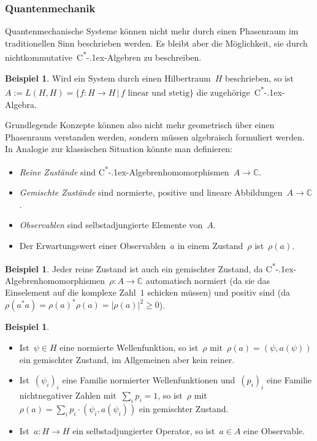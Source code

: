 \documentclass[a4paper,ngerman,12pt]{scrartcl}
\theoremstyle{definition}
\newtheorem{bsp}[defn]{Beispiel}
\theoremstyle{plain}
\theoremstyle{remark}
\newcommand{\CC}{\mathbb{C}}
\newcommand{\csalgebra}{C\textsuperscript{*}\kern-.1ex-Algebra}
\newcommand{\csalgebren}{C\textsuperscript{*}\kern-.1ex-Alge\-bren}
\renewcommand{\_}{\mathpunct{.}\,}
\newcommand{\?}{\,{:}\,}
\begin{document}
\subsubsection*{Quantenmechanik}

Quantenmechanische Systeme können nicht mehr durch einen Phasenraum im
traditionellen Sinn beschrieben werden. Es bleibt aber die Möglichkeit, sie
durch nichtkommutative~\csalgebren{} zu beschreiben.

\begin{bsp}Wird ein System durch einen Hilbertraum~$H$ beschrieben, so ist~$A
:= L(H,H) = \{ f : H \to H \,|\, \text{$f$ linear und stetig} \}$ die
zugehörige~\csalgebra.\end{bsp}

Grundlegende Konzepte können also nicht mehr geometrisch über einen Phasenraum
verstanden werden, sondern müssen algebraisch formuliert werden. In Analogie
zur klassischen Situation könnte man definieren:
\begin{itemize}
\item \emph{Reine Zustände} sind \csalgebren{}\-homo\-mor\-phis\-men~$A \to
\CC$.
\item \emph{Gemischte Zustände} sind normierte, positive und lineare
Abbildungen~$A \to \CC$.
\item \emph{Observablen} sind selbstadjungierte Elemente von~$A$.
\item Der Erwartungswert einer Observablen~$a$ in einem Zustand~$\rho$
ist~$\rho(a)$.
\end{itemize}

\begin{bsp}Jeder reine Zustand ist auch ein gemischter Zustand, da
\csalgebren{}\-homo\-mor\-phis\-men~$\rho : A \to \CC$ automatisch normiert (da sie das
Einselement auf die komplexe Zahl~$1$ schicken müssen) und positiv sind
(da~$\rho(a^* a) = \rho(a)^* \rho(a) = |\rho(a)|^2 \geq 0$).\end{bsp}

\begin{bsp}\begin{itemize}
\item Ist~$\psi \in H$ eine normierte Wellenfunktion, so ist~$\rho$
mit~$\rho(a) = (\psi, a(\psi))$ ein gemischter Zustand, im Allgemeinen aber
kein reiner.
\item Ist~$(\psi_i)_i$ eine Familie normierter Wellenfunktionen und~$(p_i)_i$
eine Familie nichtnegativer Zahlen mit~$\sum_i p_i = 1$, so ist~$\rho$
mit~$\rho(a) = \sum_i p_i \cdot (\psi_i, a(\psi_i))$ ein gemischter Zustand.
\item Ist~$a : H \to H$ ein selbstadjungierter Operator, so ist~$a \in A$ eine
Observable.
\end{itemize}
\end{bsp}
\end{document}
